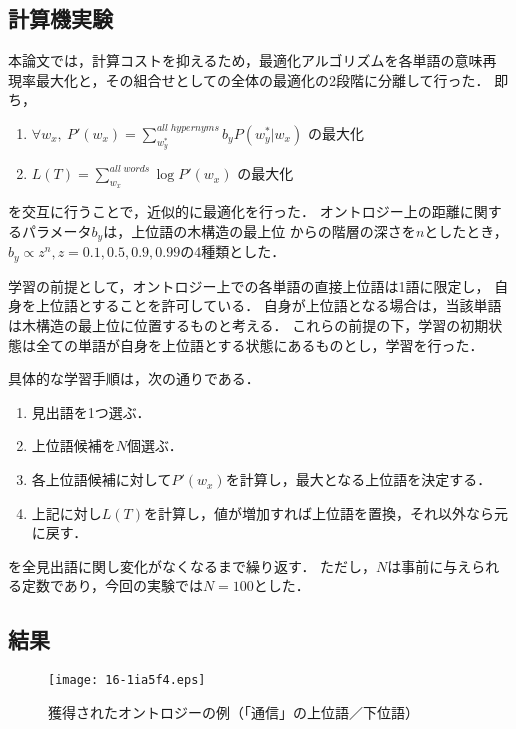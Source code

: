 \documentclass[japanese]{jnlp_1.4}
\begin{document}
\subsection{計算機実験}

本論文では，計算コストを抑えるため，最適化アルゴリズムを各単語の意味再
現率最大化と，その組合せとしての全体の最適化の2段階に分離して行った． 
即ち，
\begin{enumerate}
 \item $\forall w_x,\ P'(w_x)=\sum_{w_y^*}^{all\; hypernyms}b_y P(w_y^*|w_x)$ の最大化
 \item  $L(T)=\sum_{w_x}^{all\; words}\log P'(w_x)$ の最大化
\end{enumerate}
を交互に行うことで，近似的に最適化を行った．
オントロジー上の距離に関するパラメータ$b_y$は，上位語の木構造の最上位
からの階層の深さを$n$としたとき，$b_y \propto z^n, z=0.1,0.5,0.9,0.99$の4種類とした．

学習の前提として，オントロジー上での各単語の直接上位語は1語に限定し，
自身を上位語とすることを許可している．
自身が上位語となる場合は，当該単語は木構造の最上位に位置するものと考える．
これらの前提の下，学習の初期状態は全ての単語が自身を上位語とする状態にあるものとし，学習を行った．

具体的な学習手順は，次の通りである．
\begin{enumerate}
\item 見出語を1つ選ぶ．
\item 上位語候補を$N$個選ぶ．
\item 各上位語候補に対して$P'(w_x)$を計算し，最大となる上位語を決定する．
\item 上記に対し$L(T)$を計算し，値が増加すれば上位語を置換，それ以外なら元に戻す．
\end{enumerate}
を全見出語に関し変化がなくなるまで繰り返す．
ただし，$N$は事前に与えられる定数であり，今回の実験では$N=100$とした．



\subsection{結果}

\begin{figure}[p]
\begin{center}
\texttt{[image: 16-1ia5f4.eps]}
\end{center}
\caption{獲得されたオントロジーの例（「通信」の上位語／下位語）}
\label{fig:tree-word}
\end{figure}
\end{document}
